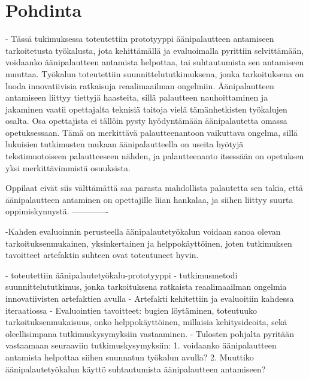 \documentclass[utf8]{gradu3}
\begin{document}
%

\chapter{Pohdinta}

- Tässä tukimuksessa toteutettiin prototyyppi äänipalautteen antamiseen tarkoitetusta työkalusta, jota kehittämällä ja evaluoimalla pyrittiin selvittämään, voidaanko äänipalautteen antamista helpottaa, tai suhtautumista sen antamiseen muuttaa. Työkalun toteutettiin suunnittelututkimuksena, jonka tarkoituksena on luoda innovatiivisia ratkaisuja reaalimaailman ongelmiin. Äänipalautteen antamiseen liittyy tiettyjä haasteita, sillä palautteen nauhoittaminen ja jakaminen vaatii opettajalta teknisiä taitoja vielä tämänhetkisten työkalujen osalta. Osa opettajista ei tällöin pysty hyödyntämään äänipalautetta omassa opetuksessaan. Tämä on merkittävä palautteenantoon vaikuttava ongelma, sillä lukuisien tutkimusten mukaan äänipalautteella on useita hyötyjä tekstimuotoiseen palautteeseen nähden, ja palautteenanto itsessään on opetuksen yksi merkittävimmistä osuuksista.

 Oppilaat eivät siis välttämättä saa parasta mahdollista palautetta sen takia, että äänipalautteen antaminen on opettajille liian hankalaa, ja siihen liittyy suurta oppimiskynnystä.
-------------

-Kahden evaluoinnin perusteella äänipalautetyökalun voidaan sanoa olevan tarkoituksenmukainen, yksinkertainen ja helppokäyttöinen, joten tutkimuksen tavoitteet artefaktin suhteen ovat toteutuneet hyvin.

- toteutettiin äänipalautetyökalu-prototyyppi
- tutkimusmetodi suunnittelututkimus, jonka tarkoituksena ratkaista reaalimaailman ongelmia innovatiivisten artefaktien avulla
- Artefakti kehitettiin ja evaluoitiin kahdessa iteraatiossa
- Evaluointien tavoitteet: bugien löytäminen, toteutuuko tarkoituksenmukaisuus, onko helppokäyttöinen, millaisia kehitysideoita, sekä oleellisimpana tutkimuskysymyksiin vastaaminen.
- Tulosten pohjalta pyritään vastaamaan seuraaviin tutkimuskysymyksiin: 1. voidaanko äänipalautteen antamista helpottaa siihen suunnatun työkalun avulla? 2. Muuttiko äänipalautetyökalun käyttö suhtautumista äänipalautteen antamiseen?
\end{document}
